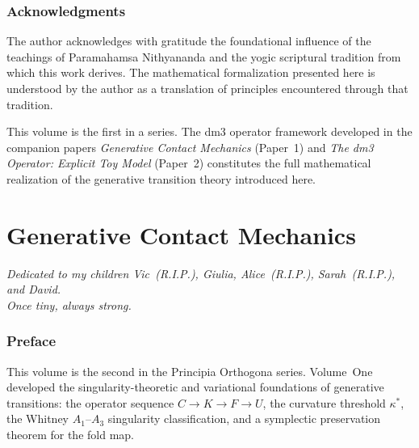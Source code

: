 \documentclass[12pt, oneside]{book}
\theoremstyle{plain}
\theoremstyle{definition}
\theoremstyle{remark}
\begin{document}
\section*{Acknowledgments}

The author acknowledges with gratitude the foundational influence of
the teachings of Paramahamsa Nithyananda and the yogic scriptural
tradition from which this work derives. The mathematical formalization
presented here is understood by the author as a translation of
principles encountered through that tradition.

This volume is the first in a series. The dm3 operator framework
developed in the companion papers \emph{Generative Contact Mechanics}
(Paper~1) and \emph{The dm3 Operator: Explicit Toy Model} (Paper~2)
constitutes the full mathematical realization of the generative
transition theory introduced here.
\cleardoublepage


\part{Generative Contact Mechanics}

\begin{center}
\emph{Dedicated to my children Vic~(R.I.P.), Giulia,
  Alice~(R.I.P.), Sarah~(R.I.P.), and David.}\\[4pt]
\emph{Once tiny, always strong.}
\end{center}

\vspace{1.5em}
\newpage

\section*{Preface}

This volume is the second in the Principia Orthogona series.
Volume~One~\cite{PO1} developed the singularity-theoretic and
variational foundations of generative transitions: the operator
sequence $C\to K\to F\to U$, the curvature threshold $\kappa^*$,
the Whitney $A_1$--$A_3$ singularity classification, and a
symplectic preservation theorem for the fold map.
\end{document}
